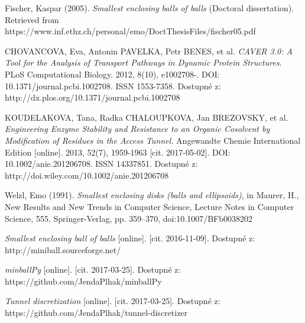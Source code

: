 \begin{thebibliography}{10}

Fischer, Kaspar (2005).
\textit{Smallest enclosing balls of balls} (Doctoral dissertation).
Retrieved from https://www.inf.ethz.ch/personal/emo/DoctThesisFiles/fischer05.pdf

CHOVANCOVA, Eva, Antonin PAVELKA, Petr BENES, et al.
\textit{CAVER 3.0: A Tool for the Analysis of Transport Pathways in Dynamic Protein Structures.}
PLoS Computational Biology. 2012, 8(10), e1002708-. DOI: 10.1371/journal.pcbi.1002708. ISSN 1553-7358. Dostupné z: http://dx.plos.org/10.1371/journal.pcbi.1002708

KOUDELAKOVA, Tana, Radka CHALOUPKOVA, Jan BREZOVSKY, et al.
\textit{Engineering Enzyme Stability and Resistance to an Organic Cosolvent by Modification of Residues in the Access Tunnel.}
Angewandte Chemie International Edition [online]. 2013, 52(7), 1959-1963 [cit. 2017-05-02]. DOI: 10.1002/anie.201206708. ISSN 14337851. Dostupné z: http://doi.wiley.com/10.1002/anie.201206708

Welzl, Emo (1991). \textit{Smallest enclosing disks (balls and ellipsoids)},
in Maurer, H., New Results and New Trends in Computer Science, Lecture Notes in Computer Science,
555, Springer-Verlag, pp. 359–370, doi:10.1007/BFb0038202

\textit{Smallest enclosing ball of balls} [online]. [cit. 2016-11-09]. Dostupné z: http://miniball.sourceforge.net/

\textit{minballPy} [online]. [cit. 2017-03-25]. Dostupné z: https://github.com/JendaPlhak/minballPy

\textit{Tunnel discretization} [online]. [cit. 2017-03-25]. Dostupné z: https://github.com/JendaPlhak/tunnel-discretizer


\end{thebibliography}

\cleardoublepage
